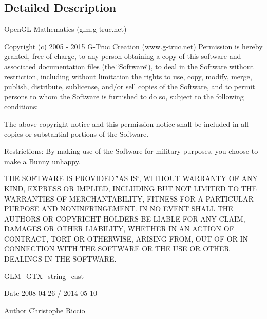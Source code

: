 \subsection{Detailed Description}
Open\-G\-L Mathematics (glm.\-g-\/truc.\-net)

Copyright (c) 2005 -\/ 2015 G-\/\-Truc Creation (www.\-g-\/truc.\-net) Permission is hereby granted, free of charge, to any person obtaining a copy of this software and associated documentation files (the \char`\"{}\-Software\char`\"{}), to deal in the Software without restriction, including without limitation the rights to use, copy, modify, merge, publish, distribute, sublicense, and/or sell copies of the Software, and to permit persons to whom the Software is furnished to do so, subject to the following conditions\-:

The above copyright notice and this permission notice shall be included in all copies or substantial portions of the Software.

Restrictions\-: By making use of the Software for military purposes, you choose to make a Bunny unhappy.

T\-H\-E S\-O\-F\-T\-W\-A\-R\-E I\-S P\-R\-O\-V\-I\-D\-E\-D \char`\"{}\-A\-S I\-S\char`\"{}, W\-I\-T\-H\-O\-U\-T W\-A\-R\-R\-A\-N\-T\-Y O\-F A\-N\-Y K\-I\-N\-D, E\-X\-P\-R\-E\-S\-S O\-R I\-M\-P\-L\-I\-E\-D, I\-N\-C\-L\-U\-D\-I\-N\-G B\-U\-T N\-O\-T L\-I\-M\-I\-T\-E\-D T\-O T\-H\-E W\-A\-R\-R\-A\-N\-T\-I\-E\-S O\-F M\-E\-R\-C\-H\-A\-N\-T\-A\-B\-I\-L\-I\-T\-Y, F\-I\-T\-N\-E\-S\-S F\-O\-R A P\-A\-R\-T\-I\-C\-U\-L\-A\-R P\-U\-R\-P\-O\-S\-E A\-N\-D N\-O\-N\-I\-N\-F\-R\-I\-N\-G\-E\-M\-E\-N\-T. I\-N N\-O E\-V\-E\-N\-T S\-H\-A\-L\-L T\-H\-E A\-U\-T\-H\-O\-R\-S O\-R C\-O\-P\-Y\-R\-I\-G\-H\-T H\-O\-L\-D\-E\-R\-S B\-E L\-I\-A\-B\-L\-E F\-O\-R A\-N\-Y C\-L\-A\-I\-M, D\-A\-M\-A\-G\-E\-S O\-R O\-T\-H\-E\-R L\-I\-A\-B\-I\-L\-I\-T\-Y, W\-H\-E\-T\-H\-E\-R I\-N A\-N A\-C\-T\-I\-O\-N O\-F C\-O\-N\-T\-R\-A\-C\-T, T\-O\-R\-T O\-R O\-T\-H\-E\-R\-W\-I\-S\-E, A\-R\-I\-S\-I\-N\-G F\-R\-O\-M, O\-U\-T O\-F O\-R I\-N C\-O\-N\-N\-E\-C\-T\-I\-O\-N W\-I\-T\-H T\-H\-E S\-O\-F\-T\-W\-A\-R\-E O\-R T\-H\-E U\-S\-E O\-R O\-T\-H\-E\-R D\-E\-A\-L\-I\-N\-G\-S I\-N T\-H\-E S\-O\-F\-T\-W\-A\-R\-E.

\hyperlink{group__gtx__string__cast}{G\-L\-M\-\_\-\-G\-T\-X\-\_\-string\-\_\-cast}

\begin{DoxyDate}{Date}
2008-\/04-\/26 / 2014-\/05-\/10 
\end{DoxyDate}
\begin{DoxyAuthor}{Author}
Christophe Riccio 
\end{DoxyAuthor}
